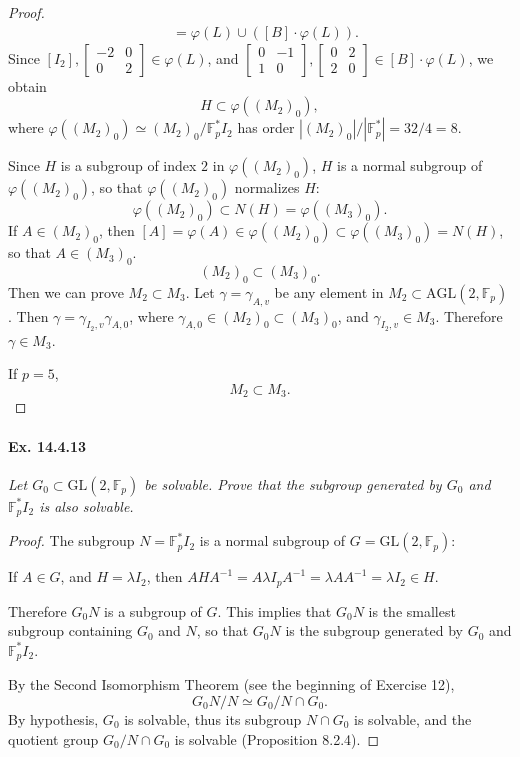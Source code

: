 \documentclass[11pt,a4paper]{article}
\newcommand{\F}{\mathbb{F}}
\begin{document}
{\begin{proof}
\begin{align*}
&= \varphi(L) \cup ([B]\cdot \varphi(L)).
\end{align*}
Since $[I_2], \begin{bmatrix} -2 & 0 \\ 0 & 2 \end{bmatrix}  \in \varphi(L)$, and $\begin{bmatrix} 0 & -1 \\ 1 & 0 \end{bmatrix}, \begin{bmatrix} 0 & 2  \\2 & 0 \end{bmatrix} \in [B]\cdot \varphi(L)$, we obtain
$$H \subset \varphi((M_2)_0 ),$$
where $\varphi((M_2)_0 ) \simeq (M_2)_0 / \F_p^*I_2$ has order $|(M_2)_0|/|\F_p^*| = 32/4 = 8$.

Since $H$ is a subgroup of index $2$ in  $\varphi((M_2)_0 )$, $H$ is a normal subgroup of $\varphi((M_2)_0 )$, so that $\varphi((M_2)_0 )$ normalizes $H$:
$$\varphi((M_2)_0 ) \subset N(H) = \varphi((M_3)_0).$$
If $A \in (M_2)_0$, then $[A] = \varphi(A) \in \varphi((M_2)_0 ) \subset \varphi((M_3)_0) = N(H)$, so that $A \in (M_3)_0$.
$$(M_2)_0 \subset (M_3)_0.$$
Then we can prove $M_2 \subset M_3$. 
Let $\gamma = \gamma_{A,v}$ be any element in $M_2 \subset \mathrm{AGL}(2,\F_p)$. Then $\gamma = \gamma_{I_2,v} \gamma_{A,0}$, where $\gamma_{A,0} \in (M_2)_0 \subset (M_3)_0$, and $\gamma_{I_2,v} \in M_3$. Therefore $\gamma \in M_3$.

If $p=5$, $$ M_2 \subset M_3.$$
\end{proof}

\paragraph{Ex. 14.4.13}{\it Let $G_0 \subset \mathrm{GL}(2,\F_p)$ be solvable. Prove that the subgroup generated by $G_0$ and $\F_p^* I_2$ is also solvable.
}

\begin{proof}
The subgroup $N = \F_p^* I_2$  is a normal subgroup of $G = \mathrm{GL}(2,\F_p)$: 

If $A \in G$, and $H = \lambda I_2$, then $A H A^{-1} = A \lambda I_p A^{-1} = \lambda A A^{-1} = \lambda I_2 \in H$.

Therefore $G_0N$ is a subgroup of $G$. This implies that $G_0 N$ is the smallest subgroup containing $G_0$ and $N$, so that $G_0N$ is the subgroup generated by $G_0$ and $\F_p^* I_2$.

By the Second Isomorphism Theorem (see the beginning of Exercise 12),
$$G_0N/N \simeq G_0/N\cap G_0.$$
By hypothesis, $G_0$ is solvable, thus its subgroup $N \cap G_0$ is solvable, and the quotient group $G_0/N\cap G_0$ is solvable (Proposition 8.2.4).


\end{proof}}
\end{document}
